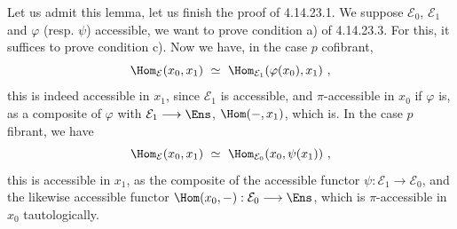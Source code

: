 Let us admit this lemma, let us finish the proof of 4.14.23.1. We suppose $\mathcal{E}_0$, $\mathcal{E}_1$ and $\varphi$ (resp. $\psi$) accessible, we want to prove condition a) of 4.14.23.3. For this, it suffices to prove condition c). Now we have, in the case $p$ cofibrant, %
\[
\Hom_{\mathcal{E}}(x_0,x_1)\ \simeq\ \Hom_{\mathcal{E}_1}(\varphi(x_0),x_1)\ ,
\]
this is indeed accessible in $x_1$, since $\mathcal{E}_1$ is accessible, and $\pi$-accessible in $x_0$ if $\varphi$ is, as a composite of $\varphi$ with $\mathcal{E}_1\longrightarrow\Ens$, $\Hom(-,x_1)$, which is. In the case $p$ fibrant, we have
\[
\Hom_{\mathcal{E}}(x_0,x_1)\ \simeq\ \Hom_{\mathcal{E}_0}(x_0,\psi(x_1))\ ,
\]
this is accessible in $x_1$, as the composite of the accessible functor $\psi:\mathcal{E}_1\longrightarrow\mathcal{E}_0$, and the likewise accessible functor $\Hom(x_0,-):\mathcal{E}_0\longrightarrow\Ens$, which is $\pi$-accessible in $x_0$ tautologically.

